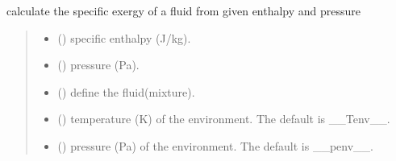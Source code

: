 \documentclass[letterpaper,10pt,english]{sphinxmanual}
\begin{document}
\begin{fulllineitems}
\label{\detokenize{fluid_properties_rp:fluid_properties_rp.hp_exergy}}
\pysigstartsignatures
{}
\pysigstopsignatures
\sphinxAtStartPar
calculate the specific exergy of a fluid from given enthalpy and pressure
\begin{quote}\begin{description}
\begin{itemize}
\item {} 
\sphinxAtStartPar
{} () \textendash{} specific enthalpy (J/kg).

\item {} 
\sphinxAtStartPar
{} () \textendash{} pressure (Pa).

\item {} 
\sphinxAtStartPar
{} (\sphinxstyleliteralemphasis{\sphinxupquote{, }}\sphinxstyleliteralemphasis{\sphinxupquote{(}}\sphinxstyleliteralemphasis{\sphinxupquote{, }}\sphinxstyleliteralemphasis{\sphinxupquote{)}}) \textendash{} define the fluid(mixture).

\item {} 
\sphinxAtStartPar
{} (\sphinxstyleliteralemphasis{\sphinxupquote{, }}) \textendash{} temperature (K) of the environment. The default is \_\_Tenv\_\_.

\item {} 
\sphinxAtStartPar
{} (\sphinxstyleliteralemphasis{\sphinxupquote{, }}) \textendash{} pressure (Pa) of the environment. The default is \_\_penv\_\_.


\end{itemize}
\end{description}
\end{quote}
\end{fulllineitems}
\end{document}
